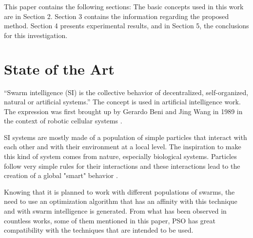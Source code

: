 \documentclass[runningheads]{llncs}
\begin{document}
This paper contains the following sections: The basic concepts used in this work are in Section 2. Section 3 contains the information regarding the proposed method. Section 4 presents experimental results, and in Section 5, the conclusions for this investigation.

\section{State of the Art}


“Swarm intelligence (SI) is the collective behavior of decentralized, self-organized, natural or artificial systems.” The concept is used in artificial intelligence work. The expression was first brought up by Gerardo Beni and Jing Wang in 1989 in the context of robotic cellular systems \cite{b4}. 

SI systems are mostly made of a population of simple particles that interact with each other and with their environment at a local level. The inspiration to make this kind of system comes from nature, especially biological systems. Particles follow very simple rules for their interactions and these interactions lead to the creation of a global "smart" behavior \cite{b5}.

Knowing that it is planned to work with different populations of swarms, the need to use an optimization algorithm that has an affinity with this technique and with swarm intelligence is generated. From what has been observed in countless works, some of them mentioned in this paper, PSO has great compatibility with the techniques that are intended to be used.
\end{document}
